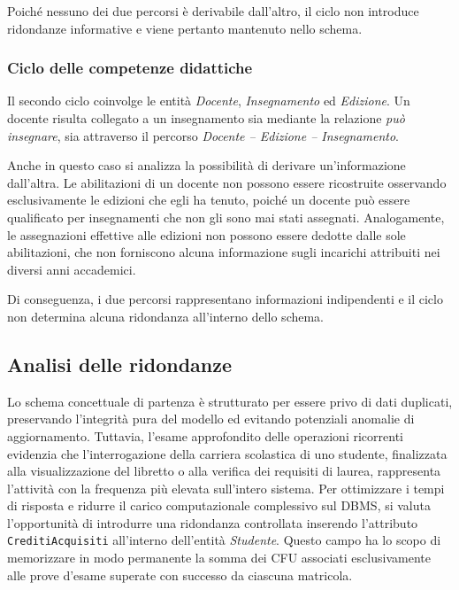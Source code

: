 Poiché nessuno dei due percorsi è derivabile dall'altro, il ciclo non introduce ridondanze informative e viene pertanto mantenuto nello schema.

\subsubsection{Ciclo delle competenze didattiche}
\label{sssec:ciclo-delle-competenze-didattiche}

Il secondo ciclo coinvolge le entità \textit{Docente}, \textit{Insegnamento} ed \textit{Edizione}. Un docente risulta collegato a un insegnamento sia mediante la relazione \textit{può insegnare}, sia attraverso il percorso \textit{Docente -- Edizione -- Insegnamento}.

Anche in questo caso si analizza la possibilità di derivare un'informazione dall'altra. Le abilitazioni di un docente non possono essere ricostruite osservando esclusivamente le edizioni che egli ha tenuto, poiché un docente può essere qualificato per insegnamenti che non gli sono mai stati assegnati. Analogamente, le assegnazioni effettive alle edizioni non possono essere dedotte dalle sole abilitazioni, che non forniscono alcuna informazione sugli incarichi attribuiti nei diversi anni accademici.

Di conseguenza, i due percorsi rappresentano informazioni indipendenti e il ciclo non determina alcuna ridondanza all'interno dello schema.

\subsection{Analisi delle ridondanze}
\label{ssec:analisi-delle-ridondanze}

Lo schema concettuale di partenza è strutturato per essere privo di dati duplicati, preservando l'integrità pura del modello ed evitando potenziali anomalie di aggiornamento.
Tuttavia, l'esame approfondito delle operazioni ricorrenti evidenzia che l'interrogazione della carriera scolastica di uno studente, finalizzata alla visualizzazione del libretto o alla verifica dei requisiti di laurea, rappresenta l'attività con la frequenza più elevata sull'intero sistema.
Per ottimizzare i tempi di risposta e ridurre il carico computazionale complessivo sul DBMS, si valuta l'opportunità di introdurre una ridondanza controllata inserendo l'attributo \texttt{CreditiAcquisiti} all'interno dell'entità \textit{Studente}.
Questo campo ha lo scopo di memorizzare in modo permanente la somma dei CFU associati esclusivamente alle prove d'esame superate con successo da ciascuna matricola.

